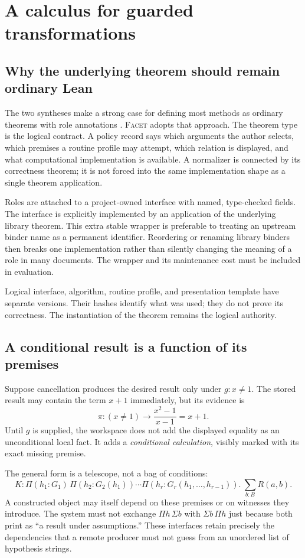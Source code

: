 \documentclass[11pt,letterpaper]{article}
\newcommand{\Facet}{\textsc{Facet}}
\numberwithin{equation}{section}
\begin{document}
\section{A calculus for guarded transformations}\label{sec:contracts}
\subsection{Why the underlying theorem should remain ordinary Lean}
The two syntheses make a strong case for defining most methods as ordinary
theorems with role annotations \cite{synthesis,blueprints}. \Facet{} adopts that
approach. The theorem type is the logical contract. A policy record says which
arguments the author selects, which premises a routine profile may attempt,
which relation is displayed, and what computational implementation is available.
A normalizer is connected by its correctness theorem; it is not forced into the
same implementation shape as a single theorem application.

Roles are attached to a project-owned interface with named, type-checked fields.
The interface is explicitly implemented by an application of the underlying
library theorem. This extra stable wrapper is preferable to treating an upstream
binder name as a permanent identifier. Reordering or renaming library binders
then breaks one implementation rather than silently changing the meaning of a
role in many documents. The wrapper and its maintenance cost must be included
in evaluation.

Logical interface, algorithm, routine profile, and presentation template have
separate versions. Their hashes identify what was used; they do not prove its
correctness. The instantiation of the theorem remains the logical authority.

\subsection{A conditional result is a function of its premises}
Suppose cancellation produces the desired result only under $g:x\ne1$. The
stored result may contain the term $x+1$ immediately, but its evidence is
\[
 \pi:(x\ne1)\to \frac{x^2-1}{x-1}=x+1.
\]
Until $g$ is supplied, the workspace does not add the displayed equality as an
unconditional local fact. It adds a \emph{conditional calculation}, visibly
marked with its exact missing premise.

The general form is a telescope, not a bag of conditions:
\[
 K:\Pi(h_1:G_1)\,\Pi(h_2:G_2(h_1))\cdots
       \Pi(h_r:G_r(h_1,\ldots,h_{r-1})).\ \sum_{b:B}R(a,b).
\]
A constructed object may itself depend on these premises or on witnesses they
introduce. The system must not exchange $\Pi h\,\Sigma b$ with
$\Sigma b\,\Pi h$ just because both print as ``a result under assumptions.''
These interfaces retain precisely the dependencies that a remote producer must
not guess from an unordered list of hypothesis strings.
\end{document}
